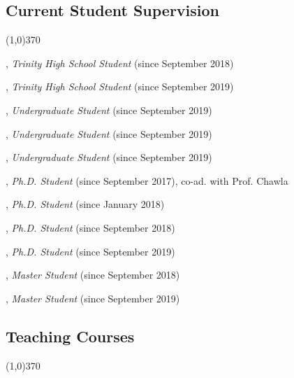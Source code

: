 \documentclass[10pt]{article}
\newenvironment{myindentpar}[1]%
{\begin{list}{}%
         {\setlength{\leftmargin}{#1}}%
         \item[]%
}
{\end{list}}
\newcounter{list}
\begin{document}
\subsection{\sc Current Student Supervision}
\vspace{-0.4cm} \line(1,0){370} \vspace{-0.1cm}

\begin{myindentpar}{0.75cm}

\hspace{-0.75cm}{\bf Eric Zhang}, \emph{Trinity High School Student} (since September 2018)

\hspace{-0.75cm}{\bf Michael Florin}, \emph{Trinity High School Student} (since September 2019)

\hspace{-0.75cm}{\bf Xiangyu Dong}, \emph{Undergraduate Student} (since September 2019)

\hspace{-0.75cm}{\bf Chan Hee Song}, \emph{Undergraduate Student} (since September 2019)

\hspace{-0.75cm}{\bf Tianze Zheng}, \emph{Undergraduate Student} (since September 2019)

\hspace{-0.75cm}{\bf Daheng Wang}, \emph{Ph.D. Student} (since September 2017), co-ad. with Prof. Chawla

\hspace{-0.75cm}{\bf Qingkai Zeng}, \emph{Ph.D. Student} (since January 2018)

\hspace{-0.75cm}{\bf Tong Zhao}, \emph{Ph.D. Student} (since September 2018)

\hspace{-0.75cm}{\bf Wenhao Yu}, \emph{Ph.D. Student} (since September 2019)

\hspace{-0.75cm}{\bf Yifan Ding}, \emph{Master Student} (since September 2018)

\hspace{-0.75cm}{\bf Jiaming Li}, \emph{Master Student} (since September 2019)

\end{myindentpar}

\subsection{\sc Teaching Courses}
\vspace{-0.4cm} \line(1,0){370} \vspace{-0.1cm}
\end{document}
